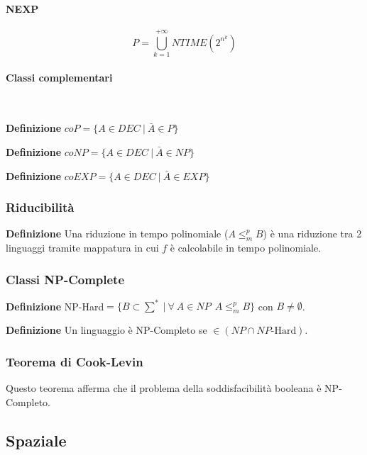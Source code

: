 \documentclass{article}
\begin{document}
\paragraph{NEXP}

$$P=\bigcup_{k=1}^{+\infty}NTIME(2^{n^k})$$

\paragraph{Classi complementari} $\ $\newline

\noindent\textbf{Definizione} $coP=\{A\in DEC\ |\ \bar{A}\in P\}$\newline

\noindent\textbf{Definizione} $coNP=\{A\in DEC\ |\ \bar{A}\in NP\}$\newline

\noindent\textbf{Definizione} $coEXP=\{A\in DEC\ |\ \bar{A}\in EXP\}$

\subsubsection{Riducibilità}

\textbf{Definizione} Una riduzione in tempo polinomiale ($A\leq_m^p B$) è una riduzione tra 2 linguaggi tramite mappatura in cui $f$ è calcolabile in tempo polinomiale.

\subsubsection{Classi NP-Complete}

\textbf{Definizione} NP-Hard$=\{B\subset\sum^*\ |\ \forall\ A\in NP\ \ A\leq_m^p B\}$ con $B\neq\emptyset$.\newline

\noindent\textbf{Definizione} Un linguaggio è NP-Completo se $\in(NP\cap NP\text{-Hard})$.\newline

\subsubsection{Teorema di Cook-Levin}

Questo teorema afferma che il problema della soddisfacibilità booleana è NP-Completo.

\subsection{Spaziale}
\end{document}
